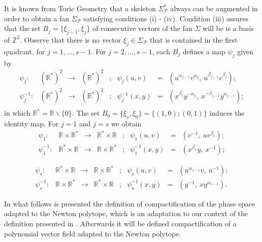 \documentclass[12pt]{amsart}
\begin{document}
It is known from Toric Geometry \cite{Brasselet,CoxLittleSchenck} that a skeleton $\Sigma^{*}_{\mathcal{P}}$ always can be augmented in order to obtain a fan $\Sigma_{\mathcal{P}}$ satisfying conditions (i) - (iv). Condition (iii) assures that the set $B_{j} = \{\xi_{j-1},\xi_{j}\}$ of consecutive vectors of the fan $\Sigma$ will be is a basis of $\mathbb{Z}^{2}$. Observe that there is no vector $\xi_{j}\in\Sigma_{\mathcal{P}}$ that is contained in the first quadrant, for $j = 1,\dots, s-1$. For $j = 2,\dots,s-1$, each $B_{j}$ defines a map $\psi_{j}$ given by
$$
\begin{array}{cccccccc}
\psi_{j}: & (\mathbb{R}^{*})^{2} & \rightarrow &  (\mathbb{R}^{*})^{2} & ; & \psi_{j}(u,v) & = & (u^{\alpha_{j-1}}v^{\alpha_{j}}, \ u^{\beta_{j-1}}v^{\beta_{j}}); \\
\psi_{j}^{-1}: & (\mathbb{R}^{*})^{2} & \rightarrow &  (\mathbb{R}^{*})^{2} & ; & \psi_{j}^{-1}(x,y) & = & (x^{\beta_{j}}y^{-\alpha_{j}}, \ x^{-\beta_{j-1}}y^{\alpha_{j-1}}); \\
\end{array}
$$
in which $\mathbb{R}^{*} = \mathbb{R}\backslash\{0\}$. The set $B_{0} = \{\xi_{s},\xi_{0}\} = \{(1,0);(0,1)\}$ induces the identity map. For $j = 1$ and $j = s$ we obtain
$$
\begin{array}{cccccccc}
\psi_{1}: & \mathbb{R}\times\mathbb{R}^{*} & \rightarrow &  \mathbb{R}^{*} \times \mathbb{R} & ; & \psi_{1}(u,v) & = & (v^{-1}, \ uv^{\beta_{1}}); \\
\psi_{1}^{-1}: & \mathbb{R}^{*}\times\mathbb{R} & \rightarrow &  \mathbb{R}\times\mathbb{R}^{*} & ; & \psi_{1}^{-1}(x,y) & = & (x^{\beta_{1}}y, \ x^{-1});
\end{array}
$$

$$
\begin{array}{cccccccc}
\psi_{s}: & \mathbb{R}^{*}\times\mathbb{R} & \rightarrow &  \mathbb{R}\times\mathbb{R}^{*} & ; & \psi_{s}(u,v) & = & (u^{\alpha_{s-1}}v, \ u^{-1}); \\
\psi_{s}^{-1}: & \mathbb{R}\times\mathbb{R}^{*} & \rightarrow &  \mathbb{R}^{*} \times \mathbb{R} & ; & \psi_{s}^{-1}(x,y) & = & (y^{-1}, \ xy^{\alpha_{s-1}}).
\end{array}
$$

In what follows is presented the definition of compactification of the phase space adapted to the Newton polytope, which is an adaptation to our context of the definition presented in \cite[Section 1.3]{Khovanskii1}. Afterwards it will be defined compactification of a polynomial vector field adapted to the Newton polytope.
\end{document}
